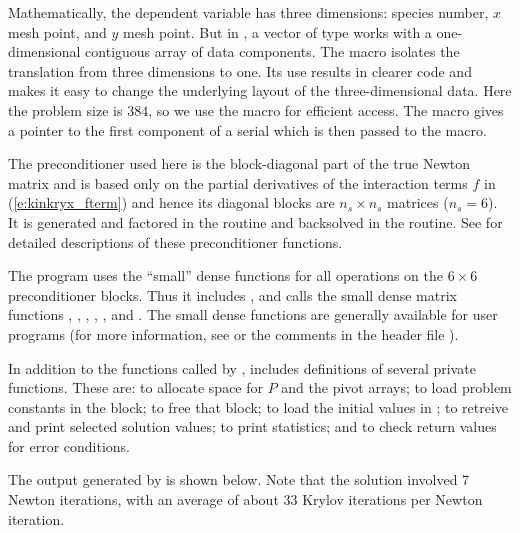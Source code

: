 Mathematically, the dependent variable has three dimensions: species
number, $x$ mesh point, and $y$ mesh point.  But in {\nvecs}, a vector of
type  works with a one-dimensional contiguous array of
data components. The macro  isolates the translation from
three dimensions to one. Its use results in clearer code and makes it
easy to change the underlying layout of the three-dimensional data. 
Here the problem size is $384$, so we use the  macro
for efficient  access. The  macro gives
a pointer to the first component of a serial  which is then
passed to the  macro.

The preconditioner used here is the block-diagonal part of the true Newton
matrix and is based only on the partial derivatives of the interaction terms $f$
in (\ref{e:kinkryx_fterm}) and hence its  diagonal blocks are $n_s \times n_s$ matrices
($n_s = 6$).
It is generated and factored in the  routine and
backsolved in the  routine.  
See  for detailed descriptions
of these preconditioner functions.

The program  uses the ``small'' dense functions for all operations 
on the $6 \times 6$ preconditioner blocks.  
Thus it includes , and calls the small dense matrix
functions , , 
, , , and .
The small dense functions are generally available for {\kinsol} user programs
(for more information, see  or the comments in the header file
).

In addition to the functions called by {\kinsol},  includes
definitions of several private functions.  These are: 
to allocate space for $P$ and the pivot arrays; 
to load problem constants in the  block;  to free
that block;  to load the initial values in ; 
 to retreive and print selected solution values;
 to print statistics; and 
to check return values for error conditions.

The output generated by  is shown below.  Note that the
solution involved 7 Newton iterations, with an average of about 33
Krylov iterations per Newton iteration.


